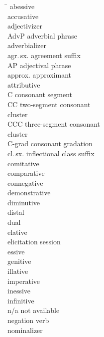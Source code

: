 \begin{multicols}{2}
\begin{tabbing}
\TABh \= \kill
{}	\> abessive \\
	\> accusative \\
	\> adjectivizer \\
AdvP	\>adverbial phrase\\
	\> adverbializer \\
agr.\,sx.	\> agreement suffix \\
AP		\>adjectival phrase\\
approx.	\>approximant\\
 	\> attributive\\
C		\>consonant segment\\
CC		\>two-segment consonant \\\> cluster\\
CCC		\>three-segment consonant \\\> cluster\\
C-grad	\> consonant gradation \\
cl.\,sx.	\> inflectional class suffix \\
	\> comitative \\
	\> comparative \\
\> connegative \\
	\> demonstrative\\
	\> diminutive \\
	\> distal \\
	\> dual \\
	\> elative \\
		\> elicitation session \\
	\> essive \\
	\> genitive \\
	\> illative \\
	\> imperative \\
	\> inessive \\
	\> infinitive \\
n/a	\> not available \\
	\> negation verb \\
	\> nominalizer \\

\end{tabbing}
\end{multicols}
